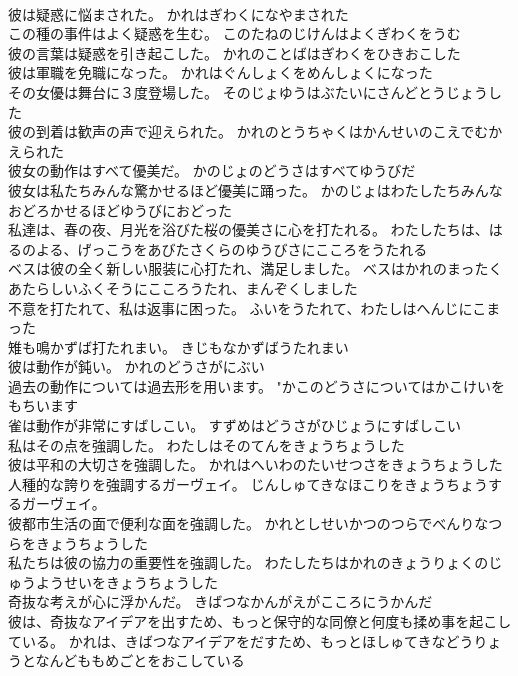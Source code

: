 \documentclass[8pt]{extreport}
\begin{document}
\begin{CJK}{UTF8}{min}
\\	彼は疑惑に悩まされた。	かれはぎわくになやまされた 
\\	この種の事件はよく疑惑を生む。	このたねのじけんはよくぎわくをうむ 
\\	彼の言葉は疑惑を引き起こした。	かれのことばはぎわくをひきおこした 
\\	彼は軍職を免職になった。	かれはぐんしょくをめんしょくになった 
\\	その女優は舞台に３度登場した。	そのじょゆうはぶたいにさんどとうじょうした 
\\	彼の到着は歓声の声で迎えられた。	かれのとうちゃくはかんせいのこえでむかえられた 
\\	彼女の動作はすべて優美だ。	かのじょのどうさはすべてゆうびだ 
\\	彼女は私たちみんな驚かせるほど優美に踊った。	かのじょはわたしたちみんなおどろかせるほどゆうびにおどった 
\\	私達は、春の夜、月光を浴びた桜の優美さに心を打たれる。	わたしたちは、はるのよる、げっこうをあびたさくらのゆうびさにこころをうたれる 
\\	ベスは彼の全く新しい服装に心打たれ、満足しました。	べスはかれのまったくあたらしいふくそうにこころうたれ、まんぞくしました 
\\	不意を打たれて、私は返事に困った。	ふいをうたれて、わたしはへんじにこまった 
\\	雉も鳴かずば打たれまい。	きじもなかずばうたれまい 
\\	彼は動作が鈍い。	かれのどうさがにぶい　 
\\	過去の動作については過去形を用います。	"かこのどうさについてはかこけいをもちいます 
\\	雀は動作が非常にすばしこい。	すずめはどうさがひじょうにすばしこい 
\\	私はその点を強調した。	わたしはそのてんをきょうちょうした 
\\	彼は平和の大切さを強調した。	かれはへいわのたいせつさをきょうちょうした 
\\	人種的な誇りを強調するガーヴェイ。	じんしゅてきなほこりをきょうちょうするガーヴェイ。 
\\	彼都市生活の面で便利な面を強調した。	かれとしせいかつのつらでべんりなつらをきょうちょうした 
\\	私たちは彼の協力の重要性を強調した。	わたしたちはかれのきょうりょくのじゅうようせいをきょうちょうした 
\\	奇抜な考えが心に浮かんだ。	きばつなかんがえがこころにうかんだ 
\\	彼は、奇抜なアイデアを出すため、もっと保守的な同僚と何度も揉め事を起こしている。	かれは、きばつなアイデアをだすため、もっとほしゅてきなどうりょうとなんどももめごとをおこしている 

\end{CJK}
\end{document}
